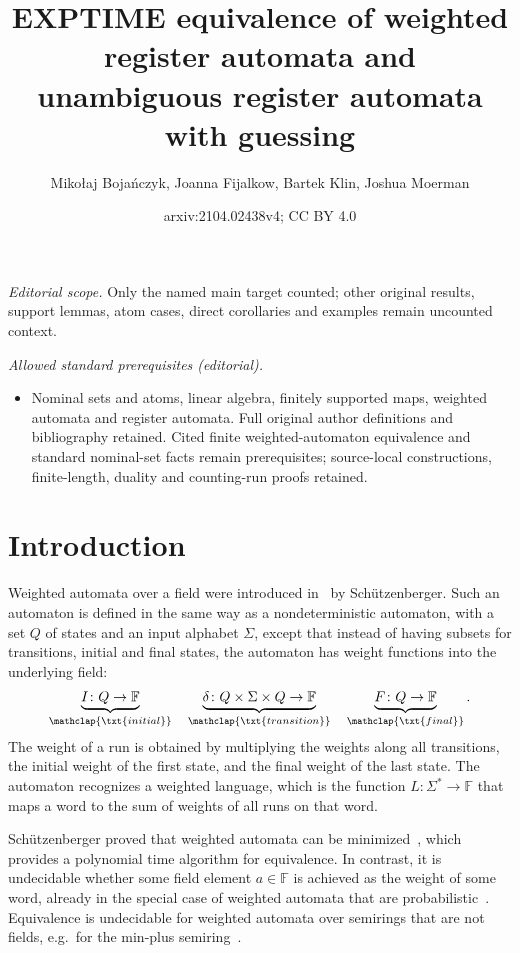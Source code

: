 \documentclass[10pt,a4paper]{amsart}
\title{EXPTIME equivalence of weighted register automata and unambiguous register automata with guessing}
\author{Mikołaj Bojańczyk, Joanna Fijalkow, Bartek Klin, Joshua Moerman}
\date{arxiv:2104.02438v4; CC BY 4.0}
\numberwithin{equation}{section}
\newcommand{\myunderbrace}[2]{\underbrace{#1}_{\mathclap{\txt{\scriptsize #2}}}}
\newcommand{\field}{\mathbb F}
\newcommand{\schutz}{Sch\"utzenberger\xspace}
\begin{document}
\maketitle
\noindent\textit{Editorial scope.} Only the named main target counted; other original results, support lemmas, atom cases, direct corollaries and examples remain uncounted context.\par\medskip
\noindent\textit{Allowed standard prerequisites (editorial).}\begin{itemize}
\item Nominal sets and atoms, linear algebra, finitely supported maps, weighted automata and register automata. Full original author definitions and bibliography retained. Cited finite weighted-automaton equivalence and standard nominal-set facts remain prerequisites; source-local constructions, finite-length, duality and counting-run proofs retained.
\end{itemize}\medskip
\section{Introduction}
Weighted automata over a field were introduced in~\cite{schutzenberger1961definition} by \schutz. Such an automaton is defined in the same way as a nondeterministic automaton, with a set $Q$ of states and an input alphabet $\Sigma$, except that instead of having subsets for transitions, initial and final states, the automaton has weight functions into the underlying field:
\begin{align*}
    \myunderbrace{I \colon Q \to \field}{initial} 
    \quad 
    \myunderbrace{\delta \colon Q \times \Sigma \times Q \to \field}{transition}
    \quad 
    \myunderbrace{F \colon Q \to \field}{final}.
\end{align*}
The weight of a run is obtained by multiplying the weights along all transitions, the initial weight of the first state, and the final weight of the last state. The  automaton recognizes a weighted language, which  is the function $L \colon \Sigma^* \to \field$ that maps a word to the sum of weights of all runs on that word.   

\schutz proved that weighted automata can be minimized~\cite[Sec.~B]{schutzenberger1961definition},
which provides a polynomial time algorithm for equivalence.
In contrast, it is undecidable whether some field element $a \in \field$ is achieved as the weight of some  word,  already in the special case of weighted automata that are probabilistic~\cite[Thm.~22]{nasu1969mappings}. Equivalence  is undecidable for weighted automata over semirings that are not fields, e.g.~for the min-plus semiring~\cite[Cor.~4.3]{krob1992}.
\end{document}
